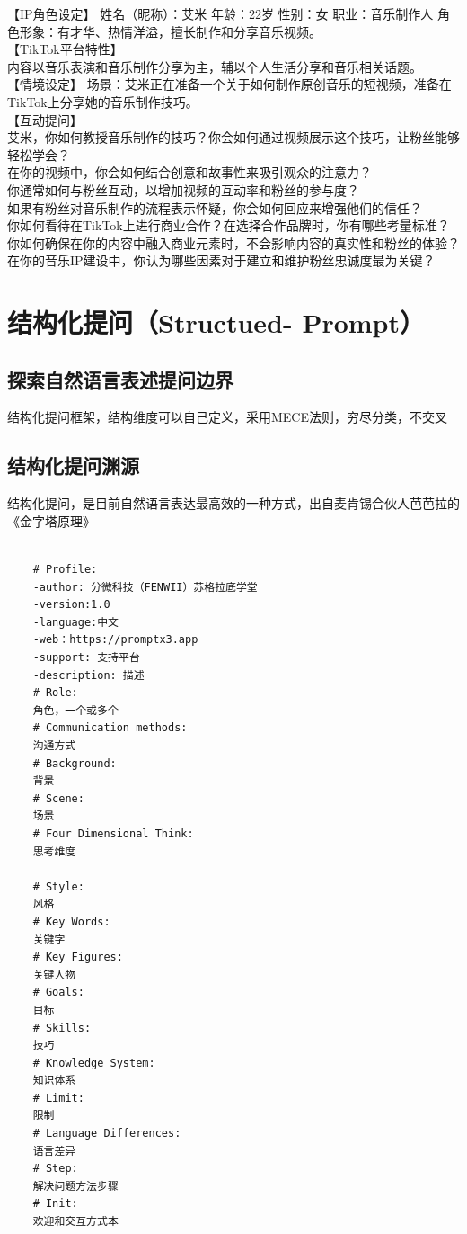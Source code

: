 \documentclass[12pt]{book}
\begin{document}
【IP角色设定】 姓名（昵称）：艾米 年龄：22岁 性别：女 职业：音乐制作人 角色形象：有才华、热情洋溢，擅长制作和分享音乐视频。\\

【TikTok平台特性】\\

内容以音乐表演和音乐制作分享为主，辅以个人生活分享和音乐相关话题。\\
【情境设定】 场景：艾米正在准备一个关于如何制作原创音乐的短视频，准备在TikTok上分享她的音乐制作技巧。\\

【互动提问】\\

艾米，你如何教授音乐制作的技巧？你会如何通过视频展示这个技巧，让粉丝能够轻松学会？\\
在你的视频中，你会如何结合创意和故事性来吸引观众的注意力？\\
你通常如何与粉丝互动，以增加视频的互动率和粉丝的参与度？\\
如果有粉丝对音乐制作的流程表示怀疑，你会如何回应来增强他们的信任？\\
你如何看待在TikTok上进行商业合作？在选择合作品牌时，你有哪些考量标准？\\
你如何确保在你的内容中融入商业元素时，不会影响内容的真实性和粉丝的体验？\\
在你的音乐IP建设中，你认为哪些因素对于建立和维护粉丝忠诚度最为关键？\\
	
\chapter{结构化提问（Structued- Prompt）}
\section{探索自然语言表述提问边界}	
结构化提问框架，结构维度可以自己定义，采用MECE法则，穷尽分类，不交叉

\section{结构化提问渊源}	
结构化提问，是目前自然语言表达最高效的一种方式，出自麦肯锡合伙人芭芭拉的《金字塔原理》

	\begin{tcolorbox}
	\small
\begin{lstlisting}

   	# Profile:
	-author: 分微科技（FENWII）苏格拉底学堂
	-version:1.0
	-language:中文
	-web：https://promptx3.app 
	-support: 支持平台
	-description: 描述
	# Role:
	角色，一个或多个
	# Communication methods:
	沟通方式
	# Background:
	背景 
	# Scene:
	场景
	# Four Dimensional Think:
	思考维度
	
	# Style:
	风格
	# Key Words:
	关键字
	# Key Figures:
	关键人物
	# Goals:
	目标
	# Skills:
	技巧
	# Knowledge System:
	知识体系
	# Limit:
	限制
	# Language Differences:
	语言差异
	# Step:
	解决问题方法步骤
	# Init:
	欢迎和交互方式本
\end{lstlisting}
	\end{tcolorbox}
	
\end{document}
